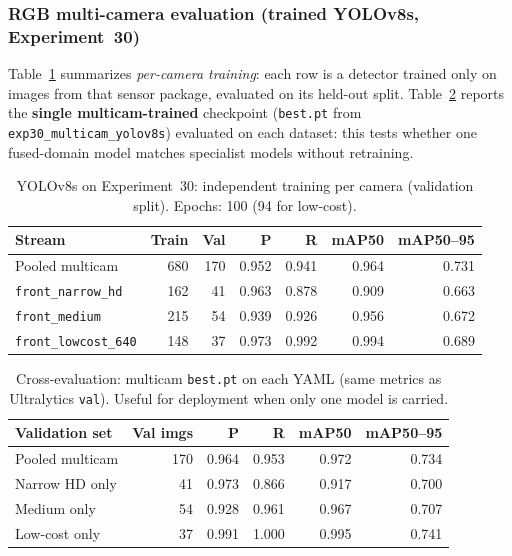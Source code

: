\subsubsection{RGB multi-camera evaluation (trained YOLOv8s, Experiment~30)}
\label{sec:rgb-multicam}
Table~\ref{tab:rgb-yolov8s-exp30} summarizes \emph{per-camera training}: each row is a detector trained only on images from that sensor package, evaluated on its held-out split. Table~\ref{tab:rgb-crossval-multicam} reports the \textbf{single multicam-trained} checkpoint (\texttt{best.pt} from \texttt{exp30\_multicam\_yolov8s}) evaluated on each dataset: this tests whether one fused-domain model matches specialist models without retraining.

\begin{table}[ht]
  \centering
  \caption{YOLOv8s on Experiment~30: independent training per camera (validation split). Epochs: 100 (94 for low-cost).}
  \label{tab:rgb-yolov8s-exp30}
  \begin{tabular}{lrrrrrr}
    \hline
    \textbf{Stream} & \textbf{Train} & \textbf{Val} & \textbf{P} & \textbf{R} & \textbf{mAP50} & \textbf{mAP50--95} \\
    \hline
    Pooled multicam & 680 & 170 & 0.952 & 0.941 & 0.964 & 0.731 \\
    \texttt{front\_narrow\_hd} & 162 & 41 & 0.963 & 0.878 & 0.909 & 0.663 \\
    \texttt{front\_medium} & 215 & 54 & 0.939 & 0.926 & 0.956 & 0.672 \\
    \texttt{front\_lowcost\_640} & 148 & 37 & 0.973 & 0.992 & 0.994 & 0.689 \\
    \hline
  \end{tabular}
\end{table}

\begin{table}[ht]
  \centering
  \caption{Cross-evaluation: multicam \texttt{best.pt} on each YAML (same metrics as Ultralytics \texttt{val}). Useful for deployment when only one model is carried.}
  \label{tab:rgb-crossval-multicam}
  \begin{tabular}{lrrrrr}
    \hline
    \textbf{Validation set} & \textbf{Val imgs} & \textbf{P} & \textbf{R} & \textbf{mAP50} & \textbf{mAP50--95} \\
    \hline
    Pooled multicam & 170 & 0.964 & 0.953 & 0.972 & 0.734 \\
    Narrow HD only & 41 & 0.973 & 0.866 & 0.917 & 0.700 \\
    Medium only & 54 & 0.928 & 0.961 & 0.967 & 0.707 \\
    Low-cost only & 37 & 0.991 & 1.000 & 0.995 & 0.741 \\
    \hline
  \end{tabular}
\end{table}

